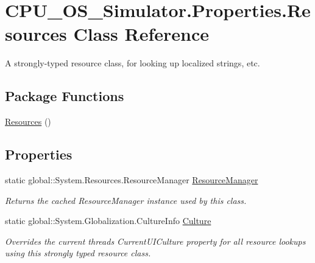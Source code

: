 \hypertarget{class_c_p_u___o_s___simulator_1_1_properties_1_1_resources}{}\section{C\+P\+U\+\_\+\+O\+S\+\_\+\+Simulator.\+Properties.\+Resources Class Reference}
\label{class_c_p_u___o_s___simulator_1_1_properties_1_1_resources}


A strongly-\/typed resource class, for looking up localized strings, etc.  


\subsection*{Package Functions}
\begin{DoxyCompactItemize}
\item 
\hyperlink{class_c_p_u___o_s___simulator_1_1_properties_1_1_resources_ae830a892b90306383137816b2194f777}{Resources} ()
\end{DoxyCompactItemize}
\subsection*{Properties}
\begin{DoxyCompactItemize}
\item 
static global\+::\+System.\+Resources.\+Resource\+Manager \hyperlink{class_c_p_u___o_s___simulator_1_1_properties_1_1_resources_a59a57fa23c17b7afe97c18c6cb3c30cc}{Resource\+Manager}
\begin{DoxyCompactList}\small\item\em Returns the cached Resource\+Manager instance used by this class. \end{DoxyCompactList}\item 
static global\+::\+System.\+Globalization.\+Culture\+Info \hyperlink{class_c_p_u___o_s___simulator_1_1_properties_1_1_resources_afb07c44f770e3a53a2df87db2ebd9af3}{Culture}
\begin{DoxyCompactList}\small\item\em Overrides the current thread\textquotesingle{}s Current\+U\+I\+Culture property for all resource lookups using this strongly typed resource class. \end{DoxyCompactList}\end{DoxyCompactItemize}
